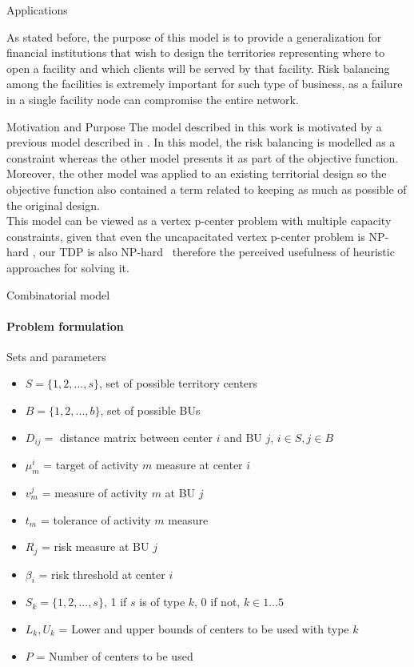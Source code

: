 \documentclass{beamer}
\begin{document}
\begin{frame}{Applications}
    \begin{figure}
        \centering
    \end{figure}
   As stated before, the purpose of this model is to provide a generalization for financial institutions that wish to design the territories representing where to open a facility and which clients will be served by that facility. Risk balancing among the facilities is extremely important for such type of business, as a failure in a single facility node can compromise the entire network.
\end{frame}

\begin{frame}{Motivation and Purpose}
    The model described in this work is motivated by a previous model described in \cite{jimo2020}. In this model, the risk balancing is modelled as a constraint whereas the other model presents it as part of the objective function. Moreover, the other model was applied to an existing territorial design so the objective function also contained a term related to keeping as much as possible of the original design. \\
    This model can be viewed as a vertex p-center problem with multiple capacity constraints, given that even the uncapacitated vertex p-center problem is NP-hard \cite{eswa2016}, our TDP is also NP-hard \, therefore the perceived usefulness of heuristic approaches for solving it.
\end{frame}

\begin{frame}{Combinatorial model}
    \framesubtitle{Problem formulation}
        Sets and parameters
        \begin{itemize}
            \item $S = \{1, 2, ..., s\}$, set of possible territory centers
            \item $B = \{1, 2, ..., b\}$, set of possible BUs
            \item $D_{ij} = $ distance matrix between center $i$ and BU $j$, $i \in S, j \in B$
            \item $\mu_m^i$ = target of activity $m$ measure at center $i$
            \item $v_m^j$ = measure of activity $m$ at BU $j$
            \item $t_m$ = tolerance of activity $m$ measure
            \item $R_j$ = risk measure at BU $j$
            \item $\beta_i$ = risk threshold at center $i$
            \item $S_k = \{1,2,...,s\}$, 1 if $s$ is of type $k$, 0 if not, $k \in 1\ldots 5$
            \item $L_k, U_k$ = Lower and upper bounds of centers to be used with type $k$
            \item $P$ = Number of centers to be used
        \end{itemize}
        
\end{frame}
\end{document}
